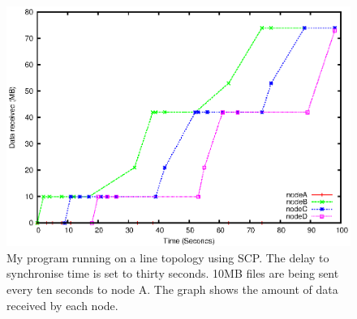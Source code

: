 \documentclass[12pt]{article}
\begin{document}
\begin{figure}[ht!]
\centering
\includegraphics[height=0.38\textheight]{images/line-scp-10-30.eps}
\caption{My program running on a line topology using SCP.
The delay to synchronise time is set to thirty seconds.
10MB files are being sent every ten seconds to node A. The graph
shows the amount of data received by each node.}
\label{fig:line_scp_10_30}
\end{figure}
\newpage
\end{document}
